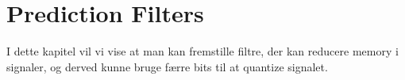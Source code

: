 \chapter{Prediction Filters}
\label{ch:part3}

I dette kapitel vil vi vise at man kan fremstille filtre, der kan reducere memory i signaler, og derved kunne bruge færre bits til at quantize signalet.

